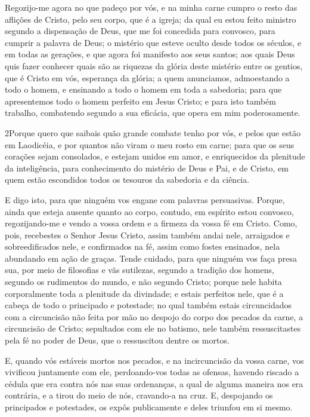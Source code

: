 Regozijo-me agora no que padeço por vós, e na minha carne cumpro
o resto das aflições de Cristo, pelo seu corpo, que é a igreja;
da qual eu estou feito ministro segundo a dispensação de
Deus, que me foi concedida para convosco, para cumprir a palavra de
Deus; o mistério que esteve oculto desde todos os séculos, e
em todas as gerações, e que agora foi manifesto aos seus santos;
aos quais Deus quis fazer conhecer quais são as riquezas da
glória deste mistério entre os gentios, que é Cristo em vós,
esperança da glória; a quem anunciamos, admoestando a todo o
homem, e ensinando a todo o homem em toda a sabedoria; para que
apresentemos todo o homem perfeito em Jesus Cristo; e para
isto também trabalho, combatendo segundo a sua eficácia, que opera
em mim poderosamente.

\medskip

\lettrine{2} Porque quero que saibais quão grande combate
tenho por vós, e pelos que estão em Laodicéia, e por quantos não
viram o meu rosto em carne; para que os seus corações sejam
consolados, e estejam unidos em amor, e enriquecidos da plenitude da
inteligência, para conhecimento do mistério de Deus e Pai, e de
Cristo, em quem estão escondidos todos os tesouros da sabedoria
e da ciência.

E digo isto, para que ninguém vos engane com palavras persuasivas.
Porque, ainda que esteja ausente quanto ao corpo, contudo, em
espírito estou convosco, regozijando-me e vendo a vossa ordem e a
firmeza da vossa fé em Cristo. Como, pois, recebestes o Senhor
Jesus Cristo, assim também andai nele, arraigados e
sobreedificados nele, e confirmados na fé, assim como fostes
ensinados, nela abundando em ação de graças. Tende cuidado, para
que ninguém vos faça presa sua, por meio de filosofias e vãs
sutilezas, segundo a tradição dos homens, segundo os rudimentos do
mundo, e não segundo Cristo; porque nele habita corporalmente
toda a plenitude da divindade; e estais perfeitos nele, que é
a cabeça de todo o principado e potestade; no qual também
estais circuncidados com a circuncisão não feita por mão no despojo
do corpo dos pecados da carne, a circuncisão de Cristo;
sepultados com ele no batismo, nele também ressuscitastes
pela fé no poder de Deus, que o ressuscitou dentre os mortos.

E, quando vós estáveis mortos nos pecados, e na incircuncisão da
vossa carne, vos vivificou juntamente com ele, perdoando-vos todas
as ofensas, havendo riscado a cédula que era contra nós nas
suas ordenanças, a qual de alguma maneira nos era contrária, e a
tirou do meio de nós, cravando-a na cruz. E, despojando os
principados e potestades, os expôs publicamente e deles triunfou em
si mesmo.

